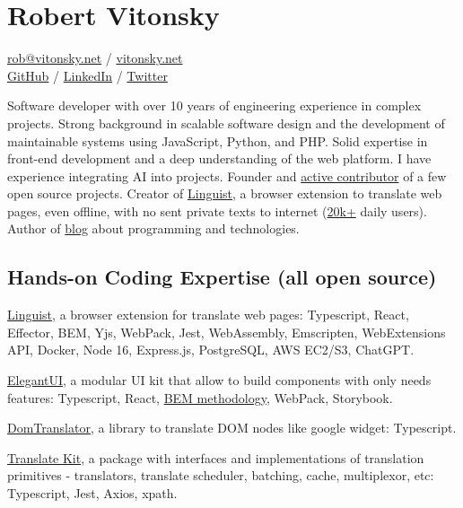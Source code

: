 \documentclass{vitonsky}
\begin{document}
\vitonskyPrintPhoto{}

\section*{\Large{Robert Vitonsky}}

\href{mailto:rob@vitonsky.net}{rob@vitonsky.net} / \href{https://vitonsky.net}{vitonsky.net}\\%
\href{https://github.com/vitonsky}{GitHub} /
\href{https://www.linkedin.com/in/vitonsky}{LinkedIn} /
\href{https://twitter.com/intent/follow?screen_name=rvitonsky}{Twitter}

\vspace*{12pt}

Software developer with over 10 years of engineering experience in complex projects. Strong background in scalable software design and the development of maintainable systems using JavaScript, Python, and PHP. Solid expertise in front-end development and a deep understanding of the web platform. I have experience integrating AI into projects. Founder and \href{https://github.com/vitonsky}{active contributor} of a few open source projects. Creator of \href{https://github.com/translate-tools/linguist}{Linguist}, a browser extension to translate web pages, even offline, with no sent private texts to internet (\href{https://github.com/translate-tools/linguist}{20k+} daily users). Author of \href{https://vitonsky.net/}{blog} about programming and technologies.

\subsection*{Hands-on Coding Expertise (all open source)}

\href{https://github.com/translate-tools/linguist}{Linguist}, a browser
extension for translate web pages: Typescript, React, Effector, BEM,
Yjs, WebPack, Jest, WebAssembly, Emscripten, WebExtensions API, Docker,
Node 16, Express.js, PostgreSQL, AWS EC2/S3, ChatGPT.

\href{https://github.com/vitonsky/react-elegant-ui}{ElegantUI}, a
modular UI kit that allow to build components with only needs features:
Typescript, React, \href{https://en.bem.info/methodology/quick-start/}{BEM methodology},
WebPack, Storybook.

\href{https://github.com/translate-tools/domtranslator}{DomTranslator}, a library to translate DOM nodes like google widget: Typescript.

\href{https://github.com/translate-tools/core}{Translate Kit}, a package with interfaces and implementations of translation primitives - translators, translate scheduler, batching, cache, multiplexor, etc: Typescript, Jest, Axios, xpath.
\end{document}
